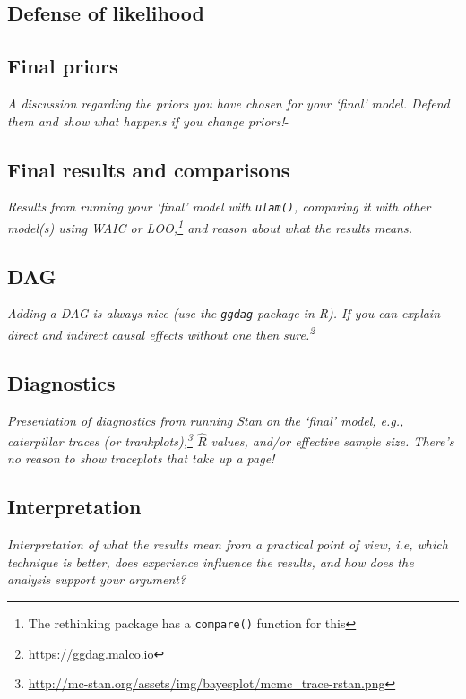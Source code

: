 \documentclass{tufte-handout}
\begin{document}
\subsection{Defense of likelihood}



\subsection{Final priors}
\textit{A discussion regarding the priors you have chosen for your `final' model. Defend them and show what happens if you change priors!}-

\subsection{Final results and comparisons}
\textit{Results from running your `final' model with \texttt{ulam()}, comparing it with other model(s) using WAIC or LOO,\footnote{The \textsf{rethinking} package has a \texttt{compare()} function for this} and reason about what the results means.}

\subsection{DAG}
\textit{Adding a DAG is always nice (use the \texttt{ggdag} package in \textsf{R}). If you can explain direct and indirect causal effects without one then sure.\footnote{\url{https://ggdag.malco.io}}}

\subsection{Diagnostics}
\textit{Presentation of diagnostics from running \textsf{Stan} on the `final' model, e.g., caterpillar traces (or trankplots),\footnote{\url{http://mc-stan.org/assets/img/bayesplot/mcmc_trace-rstan.png}} $\hat{R}$ values, and\slash or effective sample size. There's no reason to show traceplots that take up a page!}

\subsection{Interpretation}
\textit{Interpretation of what the results mean from a practical point of view, i.e, which technique is better, does experience influence the results, and how does the analysis support your argument?}



\end{document}
